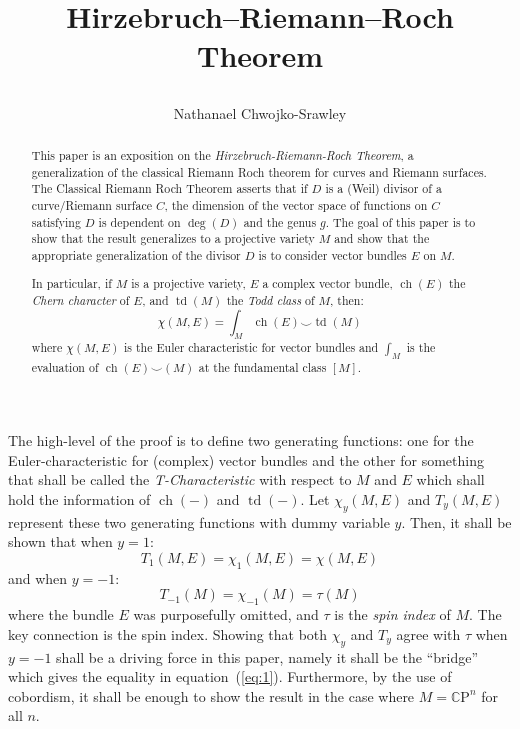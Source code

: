 \documentclass{ut-thesis}
\title{
	\begin{huge}
		\bf{Hirzebruch–Riemann–Roch Theorem}
	\end{huge}
	}
\author{Nathanael Chwojko-Srawley}
\newcommand{\CP}{{\mathbb{C}\mathrm{P}}}
\newcommand{\ch}{{\operatorname{ch}}}
\renewcommand{\deg}{{\operatorname{deg}}}
\newcommand{\td}{{\operatorname{td}}}
\renewcommand{\ch}{{\operatorname{ch}}}
\begin{document}
\frontmatter
\maketitle
\begin{abstract}
  This paper is an exposition on the \emph{Hirzebruch-Riemann-Roch Theorem}, a generalization of the classical
  Riemann Roch theorem for curves and Riemann surfaces. The Classical Riemann Roch Theorem asserts that if $D$
  is a (Weil) divisor of a curve/Riemann surface $C$, the dimension of the vector space of functions on $C$
  satisfying $D$ is dependent on $\deg(D)$ and the genus $g$. The goal of this paper is to
  show that the result generalizes to a projective variety $M$ and show that the appropriate generalization of the
  divisor $D$ is to consider vector bundles $E$ on $M$.

  In particular, if $M$ is a projective variety, $E$ a complex vector bundle, $\ch(E)$ the \emph{Chern character} of $E$, and $\td(M)$ the \emph{Todd class} of $M$, then:
  \begin{equation}\label{eq:1}
    \chi(M, E) = \int_M \ch(E)\smile \td(M)
  \end{equation}
  where $\chi(M, E)$ is the Euler characteristic for vector bundles and $\int_M$ is the evaluation of
  $\ch(E)\smile (M)$ at the fundamental class $[M]$.
\end{abstract}
\tableofcontents



\newpage

The high-level of the proof is to define two generating functions: one for the Euler-characteristic for
(complex) vector bundles and the other for something that shall be called the \emph{T-Characteristic} with
respect to $M$ and $E$ which shall hold the information of $\ch(-)$ and $\td(-)$. Let $\chi_y(M,E)$ and
$T_y(M,E)$ represent these two generating functions with dummy variable $y$. Then, it shall be shown that when
$y=1$:
\[
  T_1(M,E) = \chi_1(M,E) = \chi(M,E)
\]
and when $y = -1$:
\[
  T_{-1}(M) = \chi_{-1}(M) = \tau(M)
\]
where the bundle $E$ was purposefully omitted, and $\tau$ is the \emph{spin index} of $M$. The key connection
is the spin index. Showing that both $\chi_y$ and $T_y$ agree with $\tau$ when $y=-1$ shall be a driving
force in this paper, namely it shall be the ``bridge'' which gives the equality in equation~(\ref{eq:1}). Furthermore, by
the use of cobordism, it shall be enough to show the result in the case where $M = \CP^n$ for all $n$.
\end{document}

